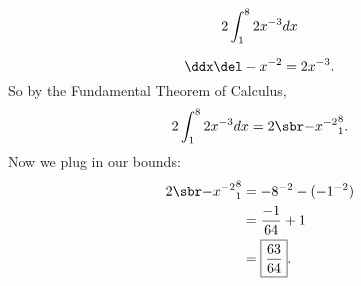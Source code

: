 \renewcommand{\avibounds}{_1^8}
\renewcommand{\avifn}{2x^{-3}}
\renewcommand{\avianti}{-x^{-2}}

\begin{probboxed}
    \[
        \aviprob{}
    \]
\end{probboxed}

\aviinversepowerrule
\[
    \ddx\del\avianti{} = \avifn{}.
\]
So by the Fundamental Theorem of Calculus,
\[
    \aviprob{}
    = \avibounded{}.
\]
Now we plug in our bounds:
\begin{align*}
    \avibounded{}
    &= -8^{-2} - (-1^{-2}) \\
    &= \frac{-1}{64} + 1 \\
    &= \boxed{\frac{63}{64}}.
\end{align*}
